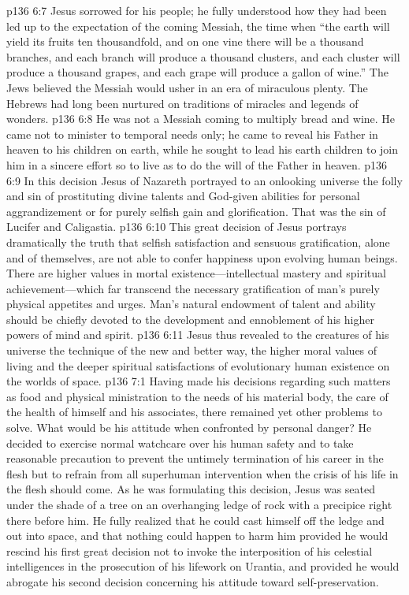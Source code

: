 \vs p136 6:7 Jesus sorrowed for his people; he fully understood how they had been led up to the expectation of the coming Messiah, the time when “the earth will yield its fruits ten thousandfold, and on one vine there will be a thousand branches, and each branch will produce a thousand clusters, and each cluster will produce a thousand grapes, and each grape will produce a gallon of wine.” The Jews believed the Messiah would usher in an era of miraculous plenty. The Hebrews had long been nurtured on traditions of miracles and legends of wonders.
\vs p136 6:8 He was not a Messiah coming to multiply bread and wine. He came not to minister to temporal needs only; he came to reveal his Father in heaven to his children on earth, while he sought to lead his earth children to join him in a sincere effort so to live as to do the will of the Father in heaven.
\pc \vs p136 6:9 In this decision Jesus of Nazareth portrayed to an onlooking universe the folly and sin of prostituting divine talents and God\hyp{}given abilities for personal aggrandizement or for purely selfish gain and glorification. That was the sin of Lucifer and Caligastia.
\vs p136 6:10 This great decision of Jesus portrays dramatically the truth that selfish satisfaction and sensuous gratification, alone and of themselves, are not able to confer happiness upon evolving human beings. There are higher values in mortal existence---intellectual mastery and spiritual achievement---which far transcend the necessary gratification of man’s purely physical appetites and urges. Man’s natural endowment of talent and ability should be chiefly devoted to the development and ennoblement of his higher powers of mind and spirit.\plusone
\vs p136 6:11 Jesus thus revealed to the creatures of his universe the technique of the new and better way, the higher moral values of living and the deeper spiritual satisfactions of evolutionary human existence on the worlds of space.
\vs p136 7:1 Having made his decisions regarding such matters as food and physical ministration to the needs of his material body, the care of the health of himself and his associates, there remained yet other problems to solve. What would be his attitude when confronted by personal danger? He decided to exercise normal watchcare over his human safety and to take reasonable precaution to prevent the untimely termination of his career in the flesh but to refrain from all superhuman intervention when the crisis of his life in the flesh should come. As he was formulating this decision, Jesus was seated under the shade of a tree on an overhanging ledge of rock with a precipice right there before him. He fully realized that he could cast himself off the ledge and out into space, and that nothing could happen to harm him provided he would rescind his first great decision not to invoke the interposition of his celestial intelligences in the prosecution of his lifework on Urantia, and provided he would abrogate his second decision concerning his attitude toward self\hyp{}preservation.\plusone
